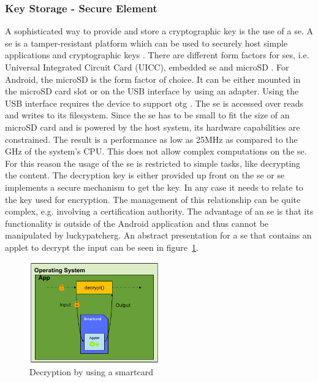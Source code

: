 \subsubsection{Key Storage - Secure Element} \label{section:counter-replace-encryption-key-local}
A sophisticated way to provide and store a cryptographic key is the use of a \gls{se}.
\newline
A \gls{se} is a tamper-resistant platform which can be used to securely host simple applications and cryptographic keys \cite{seDefinition}.
There are different form factors for \gls{se}s, i.e. Universal Integrated Circuit Card (UICC), embedded \gls{se} and microSD \cite{seDefinition}.
For Android, the microSD is the form factor of choice.
It can be either mounted in the microSD card slot or on the USB interface by using an adapter.
Using the USB interface requires the device to support \gls{otg} \cite{usbOtg}.
The \gls{se} is accessed over reads and writes to its filesystem.
Since the \gls{se} has to be small to fit the size of an microSD card and is powered by the host system, its hardware capabilities are constrained.
The result is a performance as low as 25MHz as compared to the GHz of the system's CPU.
This does not allow complex computations on the \gls{se}. \cite{stSe}
For this reason the usage of the \gls{se} is restricted to simple tasks, like decrypting the content.
The decryption key is either provided up front on the \gls{se} or \gls{se} implements a secure mechanism to get the key.
In any case it needs to relate to the key used for encryption.
The management of this relationship can be quite complex, e.g. involving a certification authority.
The advantage of an \gls{se} is that its functionality is outside of the Android application and thus cannot be manipulated by \gls{luckypatcherg}.
\newline
An abstract presentation for a \gls{se} that contains an applet to decrypt the input can be seen in figure~\ref{fig:encryptionKeySmart}.
\newline
\begin{figure}[h]
    \centering
    \includegraphics[width=0.5\textwidth]{data/encryptionKeySmart.png}
    \caption{Decryption by using a smartcard}
    \label{fig:encryptionKeySmart}
\end{figure}
